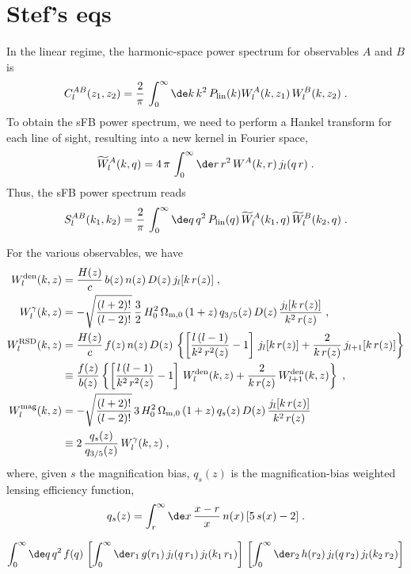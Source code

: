 \section{Stef's eqs}
In the linear regime, the harmonic-space power spectrum for observables \(A\) and \(B\) is
\begin{equation}
    C_l^{AB}(z_1,z_2) = \frac{2}{\pi}\,\int_0^{\infty}\de k\,k^2\,P_{\rm lin}(k)W^A_l(k,z_1)\,W^B_l(k,z_2)\;.
\end{equation}
To obtain the sFB power spectrum, we need to perform a Hankel transform for each line of sight, resulting into a new kernel in Fourier space,
\begin{equation}
    \widetilde W^A_l(k,q)=4\,\pi\,\int_0^{\infty}\de r\,r^2\,W^A(k,r)\,j_l(q\,r)\;.
\end{equation}
Thus, the sFB power spectrum reads
\begin{equation}
    S_l^{AB}(k_1,k_2) = \frac{2}{\pi}\,\int_0^{\infty}\de q\,q^2\,P_{\rm lin}(q)\,\widetilde W^A_l(k_1,q)\,\widetilde W^B_l(k_2,q)\;.
\end{equation}

For the various observables, we have
\begin{align}
\label{obs}
    W^{\rm den}_l(k,z)&=\frac{H(z)}c\,b(z)\,n(z)\,D(z)\,j_l[k\,r(z)]\;,\\
    W^\gamma_l(k,z)&=-\sqrt{\frac{(l+2)!}{(l-2)!}}\,\frac32\,H_0^2\,\Omega_{{\rm m},0}\,(1+z)\,q_{3/5}(z)\,D(z)\,\frac{j_l[k\,r(z)]}{k^2\,r(z)}\;,\\
    W^{\rm RSD}_l(k,z)&=\frac{H(z)}c\,f(z)\,n(z)\,D(z)\,\left\{\left[\frac{l\,(l-1)}{k^2\,r^2(z)}-1\right]\,j_l[k\,r(z)]+\frac2{k\,r(z)}\,j_{l+1}[k\,r(z)]\right\}\nonumber\\
    &\equiv\frac{f(z)}{b(z)}\left\{\left[\frac{l\,(l-1)}{k^2\,r^2(z)}-1\right]\,W^{\rm den}_l(k,z)+\frac2{k\,r(z)}\,W^{\rm den}_{l+1}(k,z)\right\}\;,\\
    W^{\rm mag}_l(k,z)&=-\sqrt{\frac{(l+2)!}{(l-2)!}}\,3\,H_0^2\,\Omega_{{\rm m},0}\,(1+z)\,q_s(z)\,D(z)\,\frac{j_l[k\,r(z)]}{k^2\,r(z)}\nonumber\\
    &\equiv2\,\frac{q_s(z)}{q_{3/5}(z)}\,W^\gamma_l(k,z)\;,
\end{align}
where, given \(s\) the magnification bias, \(q_s(z)\) is the magnification-bias weighted lensing efficiency function,
\begin{equation}
    q_s(z)=\int_r^\infty\de x\,\frac{x-r}x\,n(x)\,[5\,s(x)-2]\;.
\end{equation}

\begin{equation}
    \int_0^{\infty}\de q\,q^2\,f(q)\,\left[\int_0^{\infty}\de r_1\,g(r_1)\,j_l(q\,r_1)\,j_l(k_1\,r_1)\right]\,\left[\int_0^{\infty}\de r_2\,h(r_2)\,j_l(q\,r_2)\,j_l(k_2\,r_2)\right]
\end{equation}
